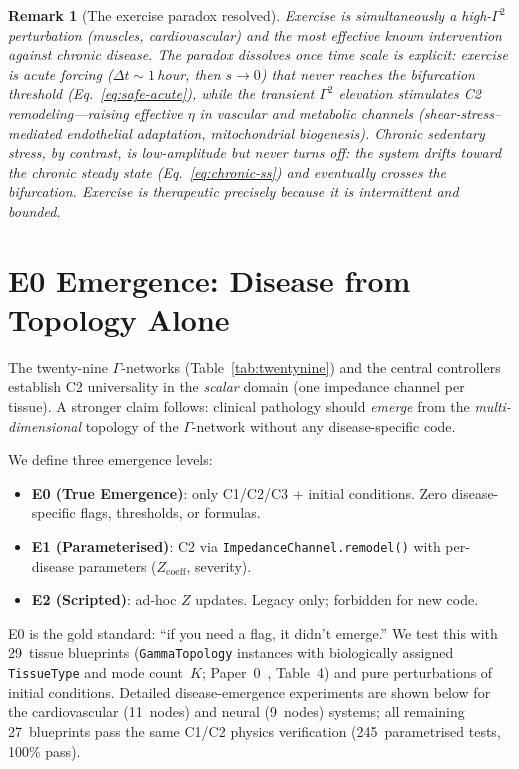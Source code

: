 \documentclass[aps,pre,twocolumn,superscriptaddress,floatfix]{revtex4-2}
\newtheorem{remark}{Remark}
\begin{document}
\begin{remark}[The exercise paradox resolved]
\label{rem:exercise}
Exercise is simultaneously a high-$\Gamma^2$
perturbation (muscles, cardiovascular) and the
most effective known intervention against chronic
disease.
The paradox dissolves once time scale is explicit:
exercise is \emph{acute} forcing
($\Delta t \sim 1$\,hour, then $s \to 0$)
that never reaches the bifurcation threshold
(Eq.~\ref{eq:safe-acute}), while the transient
$\Gamma^2$ elevation \emph{stimulates}
C2 remodeling---raising effective $\eta$ in
vascular and metabolic channels
(shear-stress--mediated endothelial adaptation,
mitochondrial biogenesis).
Chronic sedentary stress, by contrast, is
low-amplitude but \emph{never turns off}:
the system drifts toward the chronic steady state
(Eq.~\ref{eq:chronic-ss}) and eventually crosses
the bifurcation.
Exercise is therapeutic precisely because it is
\emph{intermittent and bounded}.
\end{remark}


\section{E0 Emergence: Disease from Topology Alone}
\label{sec:e0-emergence}

The twenty-nine $\Gamma$-networks (Table~\ref{tab:twentynine})
and the central controllers establish C2 universality
in the \emph{scalar} domain (one impedance channel per tissue).
A stronger claim follows: clinical pathology should
\emph{emerge} from the \emph{multi-dimensional} topology
of the $\Gamma$-network without any disease-specific code.

We define three emergence levels:
\begin{itemize}
  \item \textbf{E0 (True Emergence)}: only C1/C2/C3 + initial
    conditions.  Zero disease-specific flags, thresholds, or formulas.
  \item \textbf{E1 (Parameterised)}: C2 via
    \texttt{ImpedanceChannel.remodel()} with per-disease
    parameters ($Z_{\text{coeff}}$, severity).
  \item \textbf{E2 (Scripted)}: ad-hoc $Z$ updates.
    Legacy only; forbidden for new code.
\end{itemize}

\noindent
E0 is the gold standard: ``if you need a flag, it didn't
emerge.''
We test this with 29~tissue blueprints (\texttt{GammaTopology}
instances with biologically assigned \texttt{TissueType} and
mode count~$K$; Paper~0~\cite{Paper0}, Table~4)
and pure perturbations of initial conditions.
Detailed disease-emergence experiments are shown below for
the cardiovascular (11~nodes) and neural (9~nodes) systems;
all remaining 27~blueprints pass the same C1/C2 physics
verification (245~parametrised tests, 100\% pass).
\end{document}
